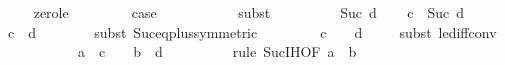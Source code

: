 \begin{isabellebody}
\ \ \ \ \isamarkupfalse%
\ zero{\isacharunderscore}{\kern0pt}le\isanewline
\ \ \ \ \isacommand{{\isachardot}{\kern0pt}}\isamarkupfalse%
\isanewline
\isanewline
\ \ \isamarkupfalse%
\ {\isacharquery}{\kern0pt}case\isanewline
\ \ \ \ \isamarkupfalse%
\ {}\isanewline
\ \ \ \ \isamarkupfalse%
{\isacharparenleft}{\kern0pt}subst\ {}{\isacharparenright}{\kern0pt}\isanewline
\ \ \ \ \isacommand{{\isachardot}{\kern0pt}}\isamarkupfalse%
\isanewline
\isanewline
{}\isamarkupfalse%
\isanewline
\ \ \isamarkupfalse%
\ {\isacharparenleft}{\kern0pt}Suc\ d{\isacharparenright}{\kern0pt}\isanewline
\ \ \isamarkupfalse%
\ {\isacartoucheopen}c\ {\isasymle}\ Suc\ d{\isacartoucheclose}\ \isamarkupfalse%
\ {}{\isacharcolon}{\kern0pt}\ {\isachardoublequoteopen}c\ {\isasymle}\ d\ {\isacharplus}{\kern0pt}\ {}{\isachardoublequoteclose}\isanewline
\ \ \ \ \isamarkupfalse%
\ {\isacharparenleft}{\kern0pt}subst\ Suc{\isacharunderscore}{\kern0pt}eq{\isacharunderscore}{\kern0pt}plus{}{\isacharbrackleft}{\kern0pt}symmetric{\isacharbrackright}{\kern0pt}{\isacharparenright}{\kern0pt}\isanewline
\ \ \ \ \isacommand{{\isachardot}{\kern0pt}}\isamarkupfalse%
\isanewline
\ \ \isamarkupfalse%
\ {\isachardoublequoteopen}c\ {\isacharminus}{\kern0pt}\ {}\ {\isasymle}\ d{\isachardoublequoteclose}\isanewline
\ \ \ \ \isamarkupfalse%
{\isacharparenleft}{\kern0pt}subst\ le{\isacharunderscore}{\kern0pt}diff{\isacharunderscore}{\kern0pt}conv{\isacharparenright}{\kern0pt}\isanewline
\ \ \ \ \isacommand{{\isachardot}{\kern0pt}}\isamarkupfalse%
\isanewline
\isanewline
\ \ \isanewline
\isanewline
\ \ \isamarkupfalse%
\ {}{\isacharcolon}{\kern0pt}\ {\isachardoublequoteopen}a\ {\isacharasterisk}{\kern0pt}\ {\isacharparenleft}{\kern0pt}c\ {\isacharminus}{\kern0pt}\ {}{\isacharparenright}{\kern0pt}\ {\isasymle}\ b\ {\isacharasterisk}{\kern0pt}\ d{\isachardoublequoteclose}\isanewline
\ \ \ \ \isanewline
\ \ \ \ \isamarkupfalse%
{\isacharparenleft}{\kern0pt}rule\ Suc{\isachardot}{\kern0pt}IH{\isacharbrackleft}{\kern0pt}OF\ {\isacartoucheopen}a\ {\isasymle}\ b{\isacartoucheclose}{\isacharbrackright}{\kern0pt}{\isacharparenright}{\kern0pt}\isanewline
\ \ \ \ \isacommand{{\isachardot}{\kern0pt}}\isamarkupfalse%
\isanewline
\isanewline
\ \ \ \isanewline
\ \ \isanewline
\ \ \isamarkupfalse%

\end{isabellebody}
